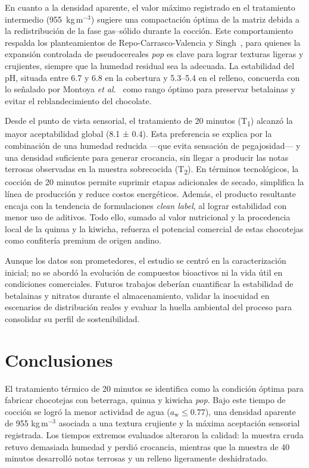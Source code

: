 \documentclass[manuscript,screen,review]{acmart}
\begin{document}
En cuanto a la densidad aparente, el valor máximo registrado en el tratamiento intermedio (955~kg\,m$^{-3}$) sugiere una compactación óptima de la matriz debida a la redistribución de la fase gas–sólido durante la cocción. Este comportamiento respalda los planteamientos de Repo-Carrasco-Valencia y Singh~\citep{RepoCarrascoValencia2009,Singh2023}, para quienes la expansión controlada de pseudocereales \textit{pop} es clave para lograr texturas ligeras y crujientes, siempre que la humedad residual sea la adecuada. La estabilidad del pH, situada entre 6.7 y 6.8 en la cobertura y 5.3–5.4 en el relleno, concuerda con lo señalado por Montoya \textit{et al.}~\citep{Montoya2011} como rango óptimo para preservar betalainas y evitar el reblandecimiento del chocolate.

Desde el punto de vista sensorial, el tratamiento de 20 minutos (T\textsubscript{1}) alcanzó la mayor aceptabilidad global (8.1 ± 0.4). Esta preferencia se explica por la combinación de una humedad reducida —que evita sensación de pegajosidad— y una densidad suficiente para generar crocancia, sin llegar a producir las notas terrosas observadas en la muestra sobrecocida (T\textsubscript{2}). En términos tecnológicos, la cocción de 20 minutos permite suprimir etapas adicionales de secado, simplifica la línea de producción y reduce costos energéticos. Además, el producto resultante encaja con la tendencia de formulaciones \emph{clean label}, al lograr estabilidad con menor uso de aditivos. Todo ello, sumado al valor nutricional y la procedencia local de la quinua y la kiwicha, refuerza el potencial comercial de estas chocotejas como confitería premium de origen andino.

Aunque los datos son prometedores, el estudio se centró en la caracterización inicial; no se abordó la evolución de compuestos bioactivos ni la vida útil en condiciones comerciales. Futuros trabajos deberían cuantificar la estabilidad de betalainas y nitratos durante el almacenamiento, validar la inocuidad en escenarios de distribución reales y evaluar la huella ambiental del proceso para consolidar su perfil de sostenibilidad.

\section{Conclusiones}

El tratamiento térmico de 20 minutos se identifica como la condición óptima para fabricar chocotejas con beterraga, quinua y kiwicha \textit{pop}. Bajo este tiempo de cocción se logró la menor actividad de agua ($a_\mathrm{w}\leq 0.77$), una densidad aparente de 955 kg\,m$^{-3}$ asociada a una textura crujiente y la máxima aceptación sensorial registrada. Los tiempos extremos evaluados alteraron la calidad: la muestra cruda retuvo demasiada humedad y perdió crocancia, mientras que la muestra de 40 minutos desarrolló notas terrosas y un relleno ligeramente deshidratado.
\end{document}
